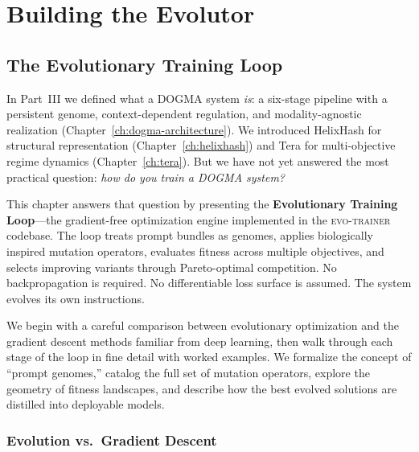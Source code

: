 
\part{Building the Evolutor}

\chapter{The Evolutionary Training Loop}
\label{ch:evolutionary-training}


\noindent
In Part~III we defined what a DOGMA system \emph{is}: a six-stage pipeline with a persistent genome, context-dependent regulation, and modality-agnostic realization (Chapter~\ref{ch:dogma-architecture}). We introduced HelixHash for structural representation (Chapter~\ref{ch:helixhash}) and Tera for multi-objective regime dynamics (Chapter~\ref{ch:tera}). But we have not yet answered the most practical question: \emph{how do you train a DOGMA system?}

This chapter answers that question by presenting the \textbf{Evolutionary Training Loop}---the gradient-free optimization engine implemented in the \textsc{evo-trainer} codebase. The loop treats prompt bundles as genomes, applies biologically inspired mutation operators, evaluates fitness across multiple objectives, and selects improving variants through Pareto-optimal competition. No backpropagation is required. No differentiable loss surface is assumed. The system evolves its own instructions.

We begin with a careful comparison between evolutionary optimization and the gradient descent methods familiar from deep learning, then walk through each stage of the loop in fine detail with worked examples. We formalize the concept of ``prompt genomes,'' catalog the full set of mutation operators, explore the geometry of fitness landscapes, and describe how the best evolved solutions are distilled into deployable models.

\section{Evolution vs.\ Gradient Descent}
\label{sec:evo-vs-gd}

